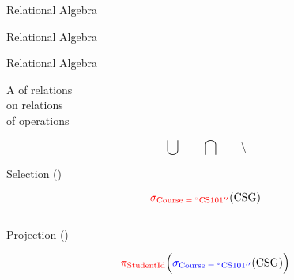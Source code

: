 \begin{frame}{}

  \vspace{0.50cm}
  \centerline{\Large Relational Algebra}
\end{frame}

\begin{frame}{}
  \centerline{\LARGE Relational Algebra}

  \vspace{0.30cm}
\end{frame}

\begin{frame}{}
  \centerline{\LARGE Relational Algebra}

  \pause
  \vspace{0.60cm}
  \begin{center}
    {\Large A  of relations} \\[8pt]

    {\Large {} on relations} \\[8pt]

    {\Large {} of operations}
  \end{center}
\end{frame}

\begin{frame}{}
  \[
    \bigcup \qquad \bigcap \qquad \setminus
  \]
\end{frame}

\begin{frame}{}
  \centerline{\Large Selection ()}

  \[
    \textcolor{red}{\sigma_{\text{\text{Course}} \;=\; ``\text{CS}101{}''}} (\text{CSG}{})
  \]

  \begin{columns}
  \end{columns}
\end{frame}

\begin{frame}{}
  \centerline{\Large Projection ()}

  \[
    \textcolor{red}{\pi_{\text{StudentId}}}\Big(\textcolor{blue}{\sigma_{\text{\text{Course}} \;=\; ``\text{CS}101{}''}} (\text{CSG}{})\Big)
  \]

  \begin{columns}
  \end{columns}
\end{frame}


